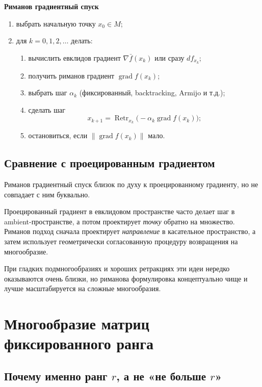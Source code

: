 \documentclass[12pt,a4paper]{article}
\theoremstyle{rudef}
\theoremstyle{ruplain}
\newcommand{\grad}{\operatorname{grad}}
\newcommand{\Retr}{\operatorname{Retr}}
\newcommand{\norm}[1]{\left\lVert #1\right\rVert}
\begin{document}
\begin{summarybox}
\textbf{Риманов градиентный спуск}
\begin{enumerate}
  \item выбрать начальную точку $x_0\in M$;
  \item для $k=0,1,2,\dots$ делать:
  \begin{enumerate}[label=\arabic*.]
    \item вычислить евклидов градиент $\nabla \bar f(x_k)$ или сразу $df_{x_k}$;
    \item получить риманов градиент $\grad f(x_k)$;
    \item выбрать шаг $\alpha_k$ (фиксированный, backtracking, Armijo и т.д.);
    \item сделать шаг
    \[
    x_{k+1}=\Retr_{x_k}\!\bigl(-\alpha_k\grad f(x_k)\bigr);
    \]
    \item остановиться, если $\norm{\grad f(x_k)}$ мало.
  \end{enumerate}
\end{enumerate}
\end{summarybox}

\subsection{Сравнение с проецированным градиентом}

Риманов градиентный спуск близок по духу к проецированному градиенту, но не совпадает с ним буквально.

Проецированный градиент в евклидовом пространстве часто делает шаг в ambient-пространстве, а потом проектирует \emph{точку} обратно на множество. Риманов подход сначала проектирует \emph{направление} в касательное пространство, а затем использует геометрически согласованную процедуру возвращения на многообразие.

При гладких подмногообразиях и хороших ретракциях эти идеи нередко оказываются очень близки, но риманова формулировка концептуально чище и лучше масштабируется на сложные многообразия.

\section{Многообразие матриц фиксированного ранга}

\subsection{Почему именно ранг $r$, а не «не больше $r$»}
\end{document}
